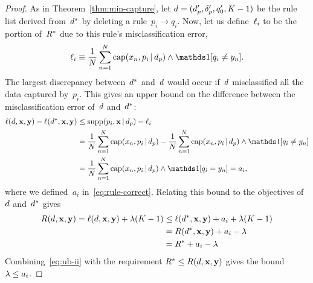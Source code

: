 \begin{arxiv}
\begin{proof}
As in Theorem~\ref{thm:min-capture},
let ${{d} =  (d_p', \delta_p', q_0', K-1)}$ be the rule list
derived from~$d^*$ by deleting a rule~${p_i \rightarrow q_i}$.
%
Now, let us define~$\ell_i$ to be the portion of~$R^*$
due to this rule's misclassification error,
\begin{align}
\Loss_i \equiv \frac{1}{N} \sum_{n=1}^N
  \Cap(x_n, p_i \given \Prefix) \wedge \one [ q_i \neq y_n ].
\end{align}
The largest discrepancy between~$d^*$ and~${d}$ would
occur if~${d}$ misclassified all the data captured by~$p_i$.
%
This gives an upper bound on the difference between
the misclassification error of~${d}$ and~$d^*$:
\begin{align}
\Loss(\RL, \x, \y) - \Loss(\OptimalRL, \x, \y)
&\le \Supp(p_i, \x \given \Prefix) - \Loss_i \nn \\
&= \frac{1}{N} \sum_{n=1}^N \Cap(x_n, p_i \given \Prefix)
  - \frac{1}{N} \sum_{n=1}^N
  \Cap(x_n, p_i \given \Prefix) \wedge \one [ q_i \neq y_n ] \nn \\
&= \frac{1}{N} \sum_{n=1}^N
  \Cap(x_n, p_i \given \Prefix) \wedge \one [ q_i = y_n ] = a_i,
\end{align}
where we defined~$a_i$ in~\eqref{eq:rule-correct}.
%
Relating this bound to the objectives of~${d}$ and~$d^*$ gives
\begin{align}
R({d}, \mathbf{x}, \mathbf{y}) = \ell({d}, \mathbf{x}, \mathbf{y}) + {\lambda} (K - 1)
&\le \ell(d^*, \mathbf{x}, \mathbf{y}) + a_i + {\lambda}(K - 1) \nonumber \\
&= R(d^*, \mathbf{x}, \mathbf{y}) + a_i - {\lambda} \nonumber \\
&= R^* + a_i - {\lambda}
\label{eq:ub-ii}
\end{align}
Combining~\eqref{eq:ub-ii} with the requirement
${R^* \le R({d}, \mathbf{x}, \mathbf{y})}$ gives the bound~${{\lambda} \le a_i}$.
\end{proof}
\end{arxiv}

